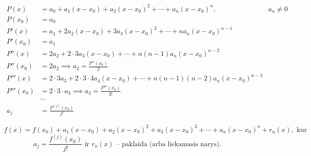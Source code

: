 \begin{align*}
  P(x) &= a_{0} + a_{1}(x - x_{0}) + a_{2}(x - x_{0})^{2} + \cdots
    + a_{n}(x - x_{0})^{n}, & a_{n} \neq 0 \\
  P(x_{0}) &= a_{0} \\
  P'(x) &= a_{1} + 2a_{2}(x - x_{0}) + 3a_{3}(x - x_{0})^{2} + \cdots
    + n a_{n}(x - x_{0})^{n-1} \\
  P'(x_{0}) &= a_{1} \\
  P''(x) &= 2 a_{2} + 2 \cdot 3 a_{3}(x - x_{0}) + \cdots 
    + n(n - 1)a_{n}(x - x_{0})^{n - 2} \\
  P''(x_{0}) &= 2 a_{2} \implies a_{2} = \frac{P''(x_{0})}{2} \\
  P'''(x) &= 2 \cdot 3 a_{3} + 2 \cdot 3 \cdot 4 a_{4} (x - x_{0}) + \cdots
    + n(n - 1)(n - 2)a_{n}(x - x_{0})^{n - 3} \\
  P'''(x_{0}) &= 2 \cdot 3 \cdot a_{3} 
    \implies a_{3} = \frac{P'''(x_{0})}{3!} \\
  &\cdots \\
  a_{j} &= \frac{P^{(j)}(x_{0})}{j!}
\end{align*}

\begin{equation}
  f(x) = f(x_{0}) + a_{1}(x - x_{0}) + a_{2}(x - x_{0})^{2} +
    a_{3}(x - x_{0})^{3} + \cdots + a_{n} (x - x_{0})^{n} +
    r_{n}(x), \text{ kur }
  \label{teiloras}
\end{equation}
\begin{equation*}
  a_{j} = \frac{f^{(j)}(x_{0})}{j!} 
  \text{ ir }
  r_{n}(x) \text{ – paklaida (arba liekamasis narys).}
\end{equation*}

